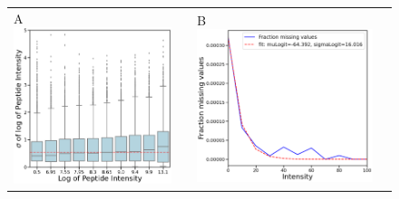 \documentclass[10pt,letterpaper]{article}
\begin{document}
\begin{figure}[H]
    \centering
    \begin{tabular}{lclc} 


        A \includegraphics[width=0.40\linewidth]{../../result/report_plots/osw_sigma_mu_boxplot_qval_filtered_peptide_filtered_qbinned.png} & &%
        B \includegraphics[width=0.45\linewidth]{../../result/report_plots/osw_fraction_missing_values.png} & \\%


\end{tabular}
\end{figure}
\end{document}
